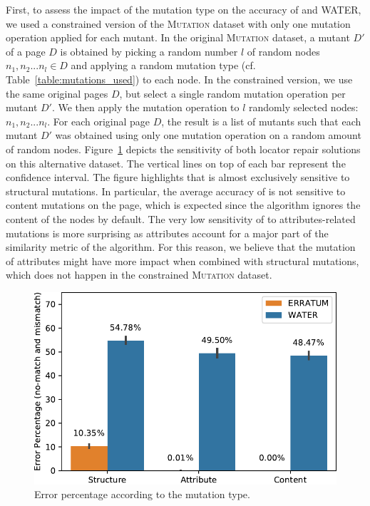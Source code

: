 First, to assess the impact of the mutation type on the accuracy of \erratum and WATER, we used a constrained version of the \textsc{Mutation} dataset with only one mutation operation applied for each mutant. 	
In the original \textsc{Mutation} dataset, a mutant $D'$ of a page $D$ is obtained by picking a random number $l$ of random nodes $n_1, n_2...n_l \in D$ and applying a random mutation type (cf. Table~\ref{table:mutations_used}) to each node.
In the constrained version, we use the same original pages $D$, but select a single random mutation operation per mutant $D'$.
We then apply the mutation operation to $l$ randomly selected nodes: $n_1, n_2...n_l$. 
For each original page $D$, the result is a list of mutants such that each mutant $D'$ was obtained using only one mutation operation on a random amount of random nodes.
Figure~\ref{fig:mutationTypeAnalysis} depicts the sensitivity of both locator repair solutions on this alternative dataset.
The vertical lines on top of each bar represent the confidence interval.
The figure highlights that \erratum is almost exclusively sensitive to structural mutations.
In particular, the average accuracy of \erratum is not sensitive to content mutations on the page, which is expected since the algorithm ignores the content of the nodes by default.
The very low sensitivity of \erratum to attributes-related mutations is more surprising as attributes account for a major part of the similarity metric of the algorithm.
For this reason, we believe that the mutation of attributes might have more impact when combined with structural mutations, which does not happen in the constrained \textsc{Mutation} dataset.

\begin{figure}[]
  \centering
  \includegraphics[width=.8\linewidth]{erratum/mutationTypeAnalysis}
  \caption{Error percentage according to the mutation type.}
  \label{fig:mutationTypeAnalysis}
\end{figure}


